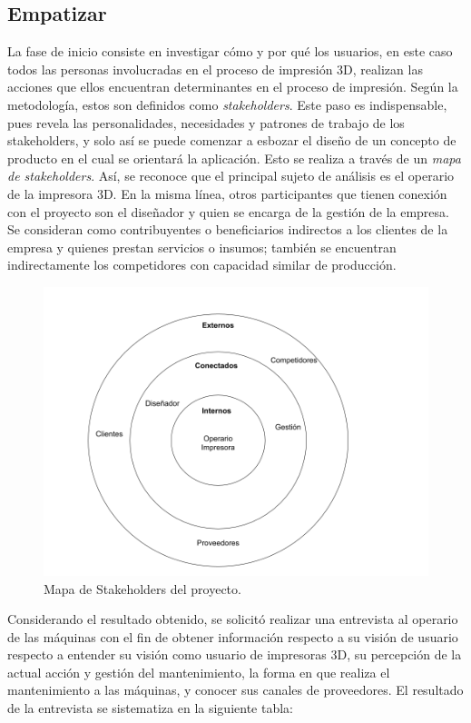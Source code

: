 \subsection{Empatizar}

La fase de inicio consiste en investigar cómo y por qué los usuarios, en este caso todos las personas involucradas en el proceso de impresión 3D, realizan las acciones que ellos encuentran determinantes en el proceso de impresión. Según la metodología, estos son definidos como \textit{stakeholders}. Este paso es indispensable, pues revela las personalidades, necesidades y patrones de trabajo de los stakeholders, y solo así se puede comenzar a esbozar el diseño de un concepto de producto en el cual se orientará la aplicación. Esto se realiza a través de un \textit{mapa de stakeholders}. Así, se reconoce que el principal sujeto de análisis es el operario de la impresora 3D. En la misma línea, otros participantes que tienen conexión con el proyecto son el diseñador y quien se encarga de la gestión de la empresa. Se consideran como contribuyentes o beneficiarios indirectos a los clientes de la empresa y quienes prestan servicios o insumos; también se encuentran indirectamente los competidores con capacidad similar de producción.

\begin{figure}[H]
\centering
\includegraphics[scale=0.4]{images/stakeholders.png}
\caption{Mapa de Stakeholders del proyecto.}
\end{figure}

Considerando el resultado obtenido, se solicitó realizar una entrevista al operario de las máquinas con el fin de obtener información respecto a su visión de usuario respecto a entender su visión como usuario de impresoras 3D, su percepción de la actual acción y gestión del mantenimiento, la forma en que realiza el mantenimiento a las máquinas, y conocer sus canales de proveedores. El resultado de la entrevista se sistematiza en la siguiente tabla:


